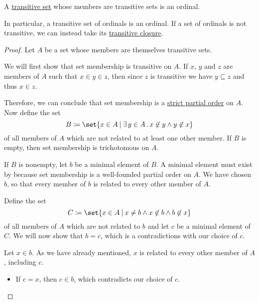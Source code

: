 \begin{proposition}\label{thm:transitive_set_of_transitive_sets}
  A \hyperref[def:transitive_set]{transitive set} whose members are transitive sets is an ordinal.

  In particular, a transitive set of ordinals is an ordinal. If a set of ordinals is not transitive, we can instead take its \hyperref[def:transitive_closure_of_a_set]{transitive closure}.
\end{proposition}
\begin{proof}
  Let \( A \) be a set whose members are themselves transitive sets.

  We will first show that set membership is transitive on \( A \). If \( x \), \( y \) and \( z \) are members of \( A \) such that \( x \in y \in z \), then since \( z \) is transitive we have \( y \subseteq z \) and thus \( x \in z \).

  Therefore, we can conclude that set membership is a \hyperref[def:partially_ordered_set/strict]{strict partial order} on \( A \). Now define the set
  \begin{equation*}
    B \coloneqq \set{ x \in A \given \qexists {y \in A} x \not\in y \wedge y \not\in x }
  \end{equation*}
  of all members of \( A \) which are not related to at least one other member. If \( B \) is empty, then set membership is trichotomous on \( A \).

  If \( B \) is nonempty, let \( b \) be a minimal element of \( B \). A minimal element must exist by  because set membership is a well-founded partial order on \( A \). We have chosen \( b \), so that every member of \( b \) is related to every other member of \( A \).

  Define the set
  \begin{equation*}
    C \coloneqq \set{ x \in A \given x \neq b \wedge x \not\in b \wedge b \not\in x }
  \end{equation*}
  of all members of \( A \) which are not related to \( b \) and let \( c \) be a minimal element of \( C \). We will now show that \( b = c \), which is a contradictions with our choice of \( c \).

  Let \( x \in b \). As we have already mentioned, \( x \) is related to every other member of \( A \), including \( c \).
  \begin{itemize}
    \item If \( c = x \), then \( c \in b \), which contradicts our choice of \( c \).


\end{itemize}
\end{proof}

